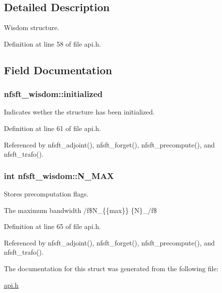 \subsection{Detailed Description}
Wisdom structure. 

Definition at line 58 of file api.h.

\subsection{Field Documentation}
\hypertarget{structnfsft__wisdom_bb3162b2e1faa123a9ef70f1374aa740}{
\subsubsection{ {\bf nfsft\_\-wisdom::initialized}}}
\label{structnfsft__wisdom_bb3162b2e1faa123a9ef70f1374aa740}


Indicates wether the structure has been initialized. 



Definition at line 61 of file api.h.

Referenced by nfsft\_\-adjoint(), nfsft\_\-forget(), nfsft\_\-precompute(), and nfsft\_\-trafo().\hypertarget{structnfsft__wisdom_c0d21110fe9475646b8174b1048cda51}{
\subsubsection{\setlength{\rightskip}{0pt plus 5cm}int {\bf nfsft\_\-wisdom::N\_\-MAX}}}
\label{structnfsft__wisdom_c0d21110fe9475646b8174b1048cda51}


Stores precomputation flags. 

The maximum bandwidth /f\$N\_\-\{\{max\}\}  \{N\}\_/f\$ 

Definition at line 65 of file api.h.

Referenced by nfsft\_\-adjoint(), nfsft\_\-forget(), nfsft\_\-precompute(), and nfsft\_\-trafo().

The documentation for this struct was generated from the following file:\begin{CompactItemize}
\item 
\hyperlink{api_8h}{api.h}\end{CompactItemize}
